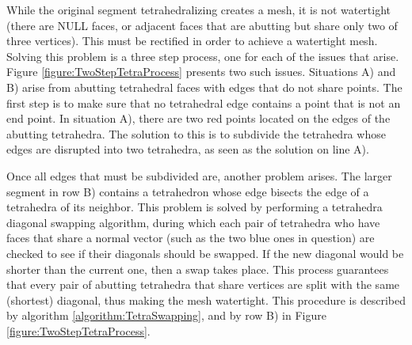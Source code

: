 While the original segment tetrahedralizing creates a mesh, it is not watertight (there are NULL faces, or adjacent faces that are abutting but share only two of three vertices). This must be rectified in order to achieve a watertight mesh. Solving this problem is a three step process, one for each of the issues that arise. Figure \ref{figure:TwoStepTetraProcess} presents two such issues. Situations A) and B) arise from abutting tetrahedral faces with edges that do not share points. The first step is to make sure that no tetrahedral edge contains a point that is not an end point. In situation A), there are two red points located on the edges of the abutting tetrahedra. The solution to this is to subdivide the tetrahedra whose edges are disrupted into two tetrahedra, as seen as the solution on line A).

Once all edges that must be subdivided are, another problem arises. The larger segment in row B) contains a tetrahedron whose edge bisects the edge of a tetrahedra of its neighbor. This problem is solved by performing a tetrahedra diagonal swapping algorithm, during which each pair of tetrahedra who have faces that share a normal vector (such as the two blue ones in question) are checked to see if their diagonals should be swapped. If the new diagonal would be shorter than the current one, then a swap takes place. This process guarantees that every pair of abutting tetrahedra that share vertices are split with the same (shortest) diagonal, thus making the mesh watertight. This procedure is described by algorithm \ref{algorithm:TetraSwapping}, and by row B) in Figure \ref{figure:TwoStepTetraProcess}.

